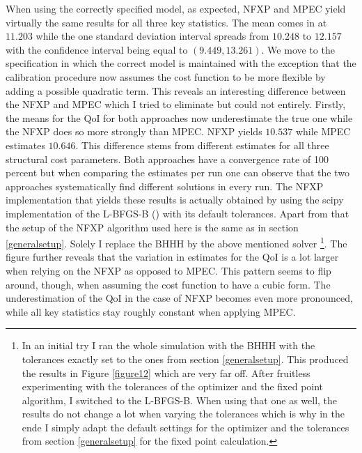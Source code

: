 When using the correctly specified model, as expected, NFXP and MPEC yield virtually the same results for all three key statistics. The mean comes in at $11.203$ while the one standard deviation interval spreads from $10.248$ to $12.157$ with the confidence interval being equal to $(9.449, 13.261)$. We move to the specification in which the correct model is maintained with the exception that the calibration procedure now assumes the cost function to be more flexible by adding a possible quadratic term. This reveals an interesting difference between the NFXP and MPEC which I tried to eliminate but could not entirely. Firstly, the means for the QoI for both approaches now underestimate the true one while the NFXP does so more strongly than MPEC. NFXP yields $10.537$ while MPEC estimates $10.646$. This difference stems from different estimates for all three structural cost parameters. Both approaches have a convergence rate of 100 percent but when comparing the estimates per run one can observe that the two approaches systematically find different solutions in every run. The NFXP implementation that yields these results is actually obtained by using the scipy implementation of the L-BFGS-B (\cite{scipy.2020}) with its default tolerances. Apart from that the setup of the NFXP algorithm used here is the same as in section \ref{generalsetup}. Solely I replace the BHHH by the above mentioned solver \footnote{In an initial try I ran the whole simulation with the BHHH with the tolerances exactly set to the ones from section \ref{generalsetup}. This produced the results in Figure \ref{figure12} which are very far off. After fruitless experimenting with the tolerances of the optimizer and the fixed point algorithm, I switched to the L-BFGS-B. When using that one as well, the results do not change a lot when varying the tolerances which is why in the ende I simply adapt the default settings for the optimizer and the tolerances from section \ref{generalsetup} for the fixed point calculation.}. The figure further reveals that the variation in estimates for the QoI is a lot larger when relying on the NFXP as opposed to MPEC. This pattern seems to flip around, though, when assuming the cost function to have a cubic form. The underestimation of the QoI in the case of NFXP becomes even more pronounced, while all key statistics stay roughly constant when applying MPEC.

